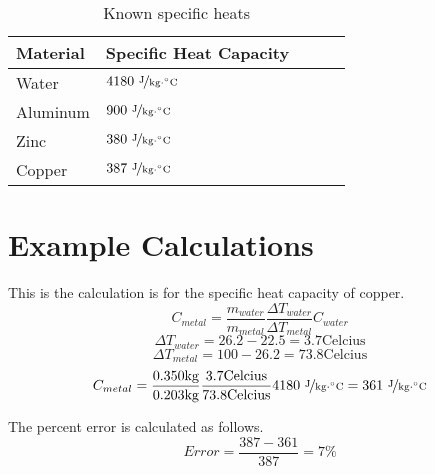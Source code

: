 \documentclass{article}
\begin{document}
\begin{table}[htbp]
\begin{center}
\footnotesize
\begin{tabular}{lllll}
\toprule
 Material  & Specific Heat Capacity \\                                                      
\midrule
  
    Water   & $4180\  \nicefrac{ \text{J}}{\text{kg}\cdot {}^{\circ}\text{C}}$       \\
    Aluminum   & $900\   \nicefrac{ \text{J}}{\text{kg}\cdot {}^{\circ}\text{C}}$       \\
    Zinc     & $380\  \nicefrac{ \text{J}}{\text{kg}\cdot {}^{\circ}\text{C}}$      \\
     Copper     & $387\   \nicefrac{ \text{J}}{\text{kg}\cdot {}^{\circ}\text{C}}$      \\
    
\bottomrule
\end{tabular}
\end{center}
  \caption{Known specific heats}
  \label{tab:font-sizes}
\end{table}

\section{Example Calculations}
This is the calculation is for the specific heat capacity of copper.
$$C_{metal}=\frac{m_{water}}{m_{metal}}  \frac{\Delta T_{water}}{\Delta T_{metal}}    C_{water}$$
$$\Delta T_{water}=26.2-22.5=3.7 \text{Celcius}$$
$$\Delta T_{metal}=100-26.2=73.8 \text{Celcius}$$
$$C_{metal}=\frac{0.350 \text{kg}}{0.203 \text{kg}}  \frac{3.7 \text{Celcius}}{73.8 \text{Celcius}}    4180\  \nicefrac{ \text{J}}{\text{kg}\cdot {}^{\circ}\text{C}}=361\  \nicefrac{ \text{J}}{\text{kg}\cdot {}^{\circ}\text{C}}$$

The percent error is calculated as follows.
$$Error=\frac{387-361}{387}=7\%$$
\end{document}
